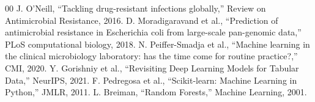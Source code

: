 \documentclass[conference]{IEEEtran}
\begin{document}
\begin{thebibliography}{00}
 J. O'Neill, ``Tackling drug-resistant infections globally,'' Review on Antimicrobial Resistance, 2016.
 D. Moradigaravand et al., ``Prediction of antimicrobial resistance in Escherichia coli from large-scale pan-genomic data,'' PLoS computational biology, 2018.
 N. Peiffer-Smadja et al., ``Machine learning in the clinical microbiology laboratory: has the time come for routine practice?,'' CMI, 2020.
 Y. Gorishniy et al., ``Revisiting Deep Learning Models for Tabular Data,'' NeurIPS, 2021.
 F. Pedregosa et al., ``Scikit-learn: Machine Learning in Python,'' JMLR, 2011.
 L. Breiman, ``Random Forests,'' Machine Learning, 2001.
\end{thebibliography}
\end{document}

